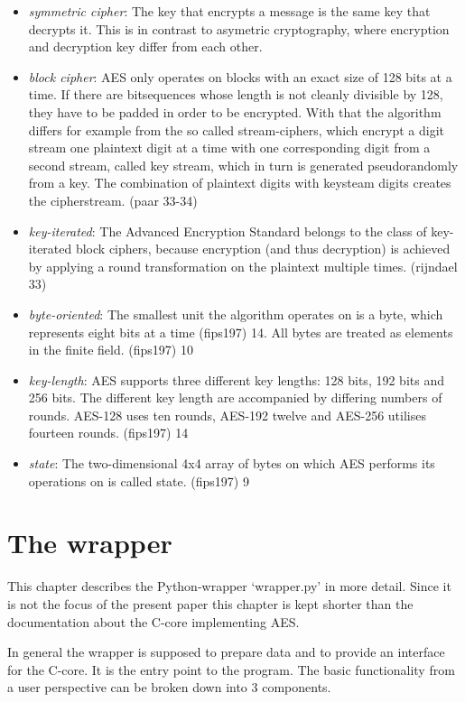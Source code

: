 \begin{itemize}
\tightlist
\item
  \emph{symmetric cipher}: The key that encrypts a message is the same
  key that decrypts it. This is in contrast to asymetric cryptography,
  where encryption and decryption key differ from each other.
\item
  \emph{block cipher}: AES only operates on blocks with an exact size of
  128 bits at a time. If there are bitsequences whose length is not
  cleanly divisible by 128, they have to be padded in order to be
  encrypted. With that the algorithm differs for example from the so
  called stream-ciphers, which encrypt a digit stream one plaintext
  digit at a time with one corresponding digit from a second stream,
  called key stream, which in turn is generated pseudorandomly from a
  key. The combination of plaintext digits with keysteam digits creates
  the cipherstream. (paar 33-34)
\item
  \emph{key-iterated}: The Advanced Encryption Standard belongs to the
  class of key-iterated block ciphers, because encryption (and thus
  decryption) is achieved by applying a round transformation on the
  plaintext multiple times. (rijndael 33)
\item
  \emph{byte-oriented}: The smallest unit the algorithm operates on is a
  byte, which represents eight bits at a time (fips197) 14. All bytes
  are treated as elements in the finite field. (fips197) 10
\item
  \emph{key-length}: AES supports three different key lengths: 128 bits,
  192 bits and 256 bits. The different key length are accompanied by
  differing numbers of rounds. AES-128 uses ten rounds, AES-192 twelve
  and AES-256 utilises fourteen rounds. (fips197) 14
\item
  \emph{state}: The two-dimensional 4x4 array of bytes on which AES
  performs its operations on is called state. (fips197) 9
\end{itemize}

\hypertarget{the-wrapper}{%
\section{The wrapper}\label{the-wrapper}}

This chapter describes the Python-wrapper `wrapper.py' in more detail.
Since it is not the focus of the present paper this chapter is kept
shorter than the documentation about the C-core implementing AES.

In general the wrapper is supposed to prepare data and to provide an
interface for the C-core. It is the entry point to the program. The
basic functionality from a user perspective can be broken down into 3
components.

